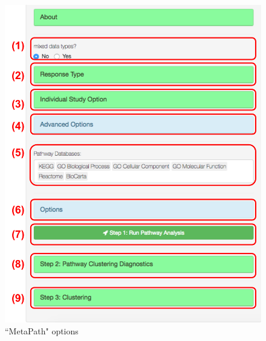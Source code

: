\begin{figure}[H]
\begin{center}
\includegraphics[scale=0.5]{./figure/metaPath/metaPathoption.pdf}
\caption{``MetaPath" options}
\label{fig:MetaPathoption}
\end{center}
\end{figure}

